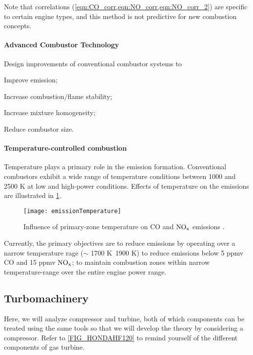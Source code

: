 Note that correlations (\cref{eqn:CO_corr,eqn:NO_corr,eqn:NO_corr_2}) are specific to certain engine types, and this method is not predictive for new combustion concepts.

\paragraph{Advanced Combustor Technology}
Design improvements of conventional combustor systems to 
\begin{itemizePacked}
\item Improve emission;
\item Increase combustion/flame stability;
\item Increase mixture homogeneity;
\item Reduce combustor size.
\end{itemizePacked}

\paragraph*{\bf Temperature-controlled combustion}

Temperature plays a primary role in the emission formation. Conventional combustors exhibit a wide range of temperature conditions between 1000 and 2500 K at low and high-power conditions. Effects of temperature on the emissions are illustrated in \cref{FIG_EMISSION_TEMP}.
\begin{figure}[!htb!]
 \centering
    {\texttt{[image: emissionTemperature]}}
    \caption{\label{FIG_EMISSION_TEMP}Influence of primary-zone temperature on CO and $\mathrm{NO_x}$ emissions \cite{LEFEBVRE_BOOK1999}.}
\end{figure}
Currently, the primary objectives are to reduce emissions by operating over a narrow temperature rage ($\sim$ 1700 K \textendash$\,$1900 K) to reduce emissions below 5 ppmv CO and 15 ppmv $\mathrm{NO_x}$; to maintain combustion zones within narrow temperature-range over the entire engine power range.

\subsection{Turbomachinery}
Here, we will analyze compressor and turbine, both of which components can be treated using the same tools so that we will develop the theory by considering a compressor. Refer to \cref{FIG_HONDAHF120} to remind yourself of the different components of gas turbine.

